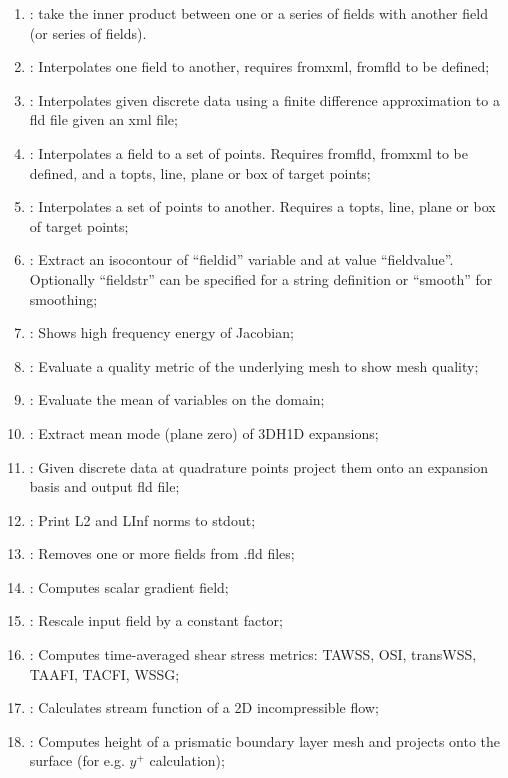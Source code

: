 \begin{enumerate}
\item {}: take the inner product between one or a series of fields with another field (or series of fields).
\item {}: Interpolates one field to another, requires fromxml, fromfld to be defined;
\item {}: Interpolates given discrete data using a finite difference approximation to a fld file given an xml file;
\item {}: Interpolates a field to a set of points. Requires fromfld, fromxml to be defined, and a topts, line, plane or box of target points;
\item {}: Interpolates a set of points to another. Requires a topts, line, plane or box of target points;
\item {}: Extract an isocontour of ``fieldid'' variable and at value ``fieldvalue''. Optionally ``fieldstr'' can be specified for a string definition or ``smooth'' for smoothing;
\item {}: Shows high frequency energy of Jacobian;
\item {}: Evaluate a quality metric of the underlying mesh to show mesh quality;
\item {}: Evaluate the mean of variables on the domain;
\item {}: Extract mean mode (plane zero) of 3DH1D expansions;
\item {}: Given discrete data at quadrature points
  project them onto an expansion basis and output fld file;
\item {}: Print L2 and LInf norms to stdout;
\item {}: Removes one or more fields from .fld files;
\item {}: Computes scalar gradient field;
\item {}: Rescale input field by a constant factor;
\item {}: Computes time-averaged shear stress metrics: TAWSS, OSI, transWSS, TAAFI, TACFI, WSSG;
\item {}: Calculates stream function of a 2D incompressible flow;
\item {}: Computes height of a prismatic boundary layer mesh and projects onto the surface (for e.g. $y^+$ calculation);

\end{enumerate}
